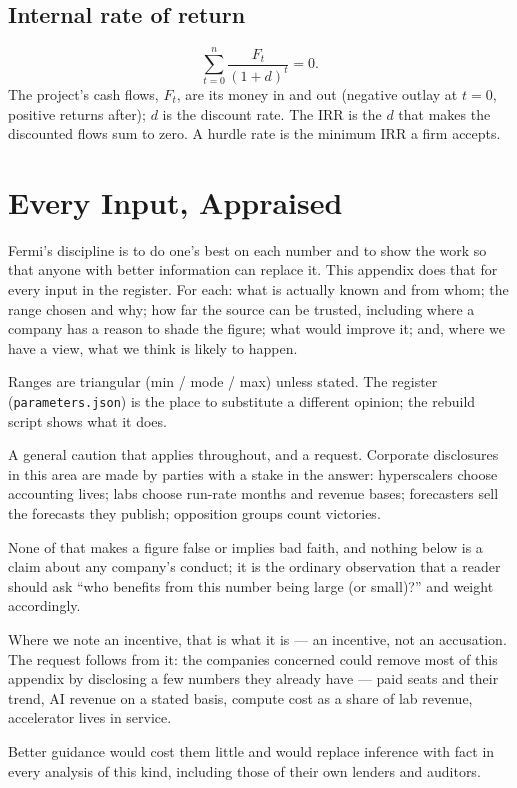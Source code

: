 \documentclass[11pt,letterpaper]{article}
\begin{document}
\subsection*{Internal rate of return}
\[\sum_{t=0}^{n}\frac{F_t}{(1+d)^{t}}=0.\]
The project's cash flows, $F_t$, are its money in and out (negative outlay at $t=0$, positive returns after); $d$ is the discount rate. The IRR is the $d$ that makes the discounted flows sum to zero. A hurdle rate is the minimum IRR a firm accepts.

\section{Every Input, Appraised}\label{app:inputs}
Fermi's discipline is to do one's best on each number and to show the work so that anyone with better information can replace it. This appendix does that for every input in the register. For each: what is actually known and from whom; the range chosen and why; how far the source can be trusted, including where a company has a reason to shade the figure; what would improve it; and, where we have a view, what we think is likely to happen.

Ranges are triangular (min / mode / max) unless stated. The register (\texttt{parameters.json}) is the place to substitute a different opinion; the rebuild script shows what it does.

A general caution that applies throughout, and a request. Corporate disclosures in this area are made by parties with a stake in the answer: hyperscalers choose accounting lives; labs choose run-rate months and revenue bases; forecasters sell the forecasts they publish; opposition groups count victories.

None of that makes a figure false or implies bad faith, and nothing below is a claim about any company's conduct; it is the ordinary observation that a reader should ask ``who benefits from this number being large (or small)?'' and weight accordingly.

Where we note an incentive, that is what it is --- an incentive, not an accusation. The request follows from it: the companies concerned could remove most of this appendix by disclosing a few numbers they already have --- paid seats and their trend, AI revenue on a stated basis, compute cost as a share of lab revenue, accelerator lives in service.

Better guidance would cost them little and would replace inference with fact in every analysis of this kind, including those of their own lenders and auditors.
\end{document}
